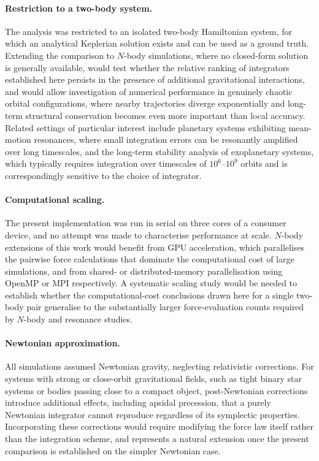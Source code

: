\paragraph{Restriction to a two-body system.} The analysis was restricted to an isolated two-body Hamiltonian
system, for which an analytical Keplerian solution exists and can be used as a ground truth. Extending the
comparison to $N$-body simulations, where no closed-form solution is generally available, would test whether
the relative ranking of integrators established here persists in the presence of additional gravitational
interactions, and would allow investigation of numerical performance in genuinely chaotic orbital
configurations, where nearby trajectories diverge exponentially and long-term structural conservation becomes
even more important than local accuracy. Related settings of particular interest include planetary systems
exhibiting mean-motion resonances, where small integration errors can be resonantly amplified over long
timescales, and the long-term stability analysis of exoplanetary systems, which typically requires integration
over timescales of $10^{6}$--$10^{9}$ orbits and is correspondingly sensitive to the choice of integrator.

\paragraph{Computational scaling.} The present implementation was run in serial on three cores of a consumer device,
and no attempt was made to characterise performance at scale. $N$-body extensions of this work would benefit from
GPU acceleration, which parallelises the pairwise force calculations that dominate the computational cost of
large simulations, and from shared- or distributed-memory parallelisation using OpenMP or MPI respectively.
A systematic scaling study would be needed to establish whether the computational-cost conclusions drawn here
for a single two-body pair generalise to the substantially larger force-evaluation counts required by $N$-body
and resonance studies.

\paragraph{Newtonian approximation.} All simulations assumed Newtonian gravity, neglecting relativistic
corrections. For systems with strong or close-orbit gravitational fields, such as tight binary star systems
or bodies passing close to a compact object, post-Newtonian corrections introduce additional effects,
including apsidal precession, that a purely Newtonian integrator cannot reproduce regardless of its symplectic
properties. Incorporating these corrections would require modifying the force law itself rather than the
integration scheme, and represents a natural extension once the present comparison is established on the
simpler Newtonian case.